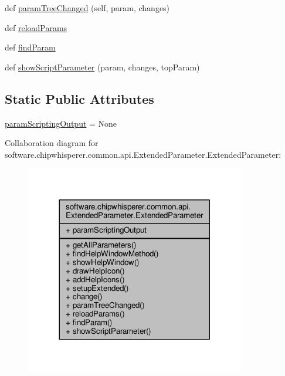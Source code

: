 \begin{DoxyCompactItemize}
def \hyperlink{classsoftware_1_1chipwhisperer_1_1common_1_1api_1_1ExtendedParameter_1_1ExtendedParameter_af1c683f13498329d6a1d06401a936bfe}{param\+Tree\+Changed} (self, param, changes)
\item 
def \hyperlink{classsoftware_1_1chipwhisperer_1_1common_1_1api_1_1ExtendedParameter_1_1ExtendedParameter_a0e2c123c60b1b6eeb91cc4b0c808e40d}{reload\+Params}
\item 
def \hyperlink{classsoftware_1_1chipwhisperer_1_1common_1_1api_1_1ExtendedParameter_1_1ExtendedParameter_a2eed34995dc4ee05168b2e75d833ddb5}{find\+Param}
\item 
def \hyperlink{classsoftware_1_1chipwhisperer_1_1common_1_1api_1_1ExtendedParameter_1_1ExtendedParameter_af7cd4372c3875a880302b2c80989a1fe}{show\+Script\+Parameter} (param, changes, top\+Param)
\end{DoxyCompactItemize}
\subsection*{Static Public Attributes}
\begin{DoxyCompactItemize}
\item 
\hyperlink{classsoftware_1_1chipwhisperer_1_1common_1_1api_1_1ExtendedParameter_1_1ExtendedParameter_a1c38aaa80058ca10945d48cbba61dde9}{param\+Scripting\+Output} = None
\end{DoxyCompactItemize}


Collaboration diagram for software.\+chipwhisperer.\+common.\+api.\+Extended\+Parameter.\+Extended\+Parameter\+:\nopagebreak
\begin{figure}[H]
\begin{center}
\leavevmode
\includegraphics[width=272pt]{d0/d83/classsoftware_1_1chipwhisperer_1_1common_1_1api_1_1ExtendedParameter_1_1ExtendedParameter__coll__graph}
\end{center}
\end{figure}


